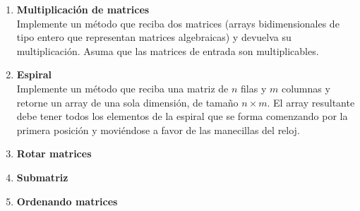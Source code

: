 \begin{enumerate}
    \item \textbf{Multiplicación de matrices}\\
    Implemente un método que reciba dos matrices (arrays bidimensionales de tipo entero que representan matrices algebraicas) y devuelva su multiplicación. Asuma que las matrices de entrada son multiplicables.

    \item \textbf{Espiral}\\
    Implemente un método que reciba una matriz de \(n\) filas y \(m\) columnas y retorne un array de una sola dimensión, de tamaño \(n \times m\). El array resultante debe tener todos los elementos de la espiral que se forma comenzando por la primera posición y moviéndose a favor de las manecillas del reloj.

    \item \textbf{Rotar matrices}\\
    

    \item \textbf{Submatriz}\\
    

    \item \textbf{Ordenando matrices}\\
    
\end{enumerate}

\newpage
